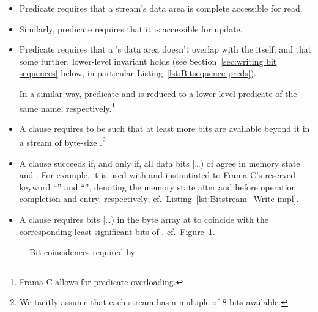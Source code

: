 \begin{itemize}
\item Predicate  requires that a stream's data area is
	complete accessible for read.
\item Similarly, predicate  requires that it is
	accessible for update.

\item Predicate  requires that a 
	's data area
	doesn't overlap with the  itself, and that some
	further, lower-level invariant holds (see 
	Section~\ref{sec:writing bit sequences} below, in particular
	Listing~\ref{lst:Bitsequence preds}).

	In a similar way, predicate  and
	 is reduced to a
	lower-level predicate of the same 
	name, 
	respectively.\footnote{Frama-C allows for predicate overloading.}

\item
	A clause  requires
	 to be such that at least 
	more bits are available beyond it in a stream of byte-size
	.\footnote{
		We tacitly assume that each stream has a multiple of 8 bits
		available.
	}

\item
	A clause
	 succeeds if,
	and only if, 
	all data bits [\ldots{})
	of  agree in memory state  and
	.
	For example, it is used with  and 
	instantiated to Frama-C's reserved keyword ``'' and
	``'', denoting the memory state after and before
	operation completion and entry, respectively; cf.\
	Listing~\ref{lst:Bitstream_Write impl}.

\item
	A clause  requires 
	bits [\ldots{}) in
	the byte array at  to coincide with the
	corresponding least significant bits of ,
	cf.~Figure~\ref{fig:EqualBits correspondance}.
\end{itemize}


\begin{figure}
\begin{center}
\vspace*{2cm}
\vspace*{2cm}
\caption{\label{fig:EqualBits correspondance}
	Bit coincidences required by }
\end{center}
\end{figure}



